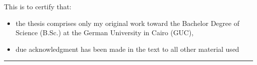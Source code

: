 \thispagestyle{plain}

This is to certify that:
\begin{itemize}
\item[(i)] the thesis comprises only my original work toward the Bachelor Degree of Science (B.Sc.) at the German University in Cairo (GUC),
\item[(ii)] due acknowledgment has been made in the text to all other material used
\end{itemize}

\vspace{2cm}
\begin{flushright}
\rule[0mm]{6cm}{0.2mm}\\
\authorOfThesis\\
\submissionDate\\
\end{flushright}
\clearpage
